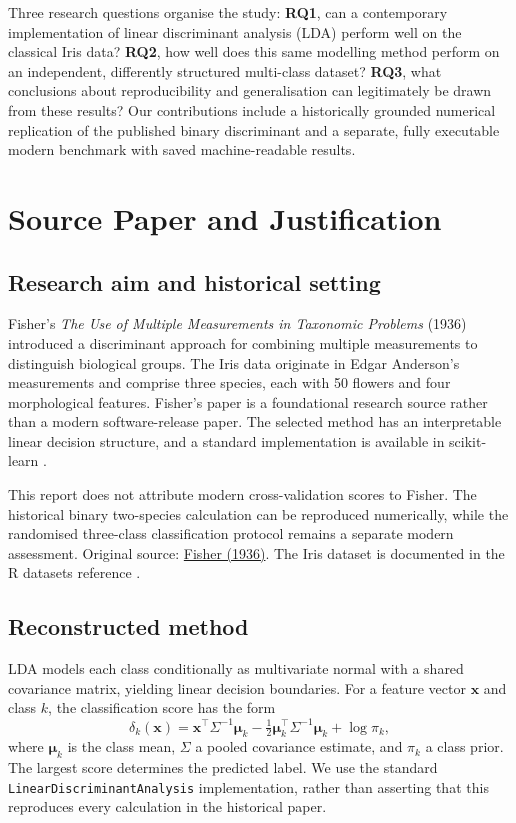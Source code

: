 \documentclass[11pt]{article}
\begin{document}
Three research questions organise the study: \textbf{RQ1}, can a contemporary implementation of linear discriminant analysis (LDA) perform well on the classical Iris data? \textbf{RQ2}, how well does this same modelling method perform on an independent, differently structured multi-class dataset? \textbf{RQ3}, what conclusions about reproducibility and generalisation can legitimately be drawn from these results? Our contributions include a historically grounded numerical replication of the published binary discriminant and a separate, fully executable modern benchmark with saved machine-readable results.

\section{Source Paper and Justification}
\subsection{Research aim and historical setting}
Fisher's \textit{The Use of Multiple Measurements in Taxonomic Problems} (1936) introduced a discriminant approach for combining multiple measurements to distinguish biological groups. The Iris data originate in Edgar Anderson's measurements and comprise three species, each with 50 flowers and four morphological features. Fisher's paper is a foundational research source rather than a modern software-release paper. The selected method has an interpretable linear decision structure, and a standard implementation is available in scikit-learn \citep{pedregosa2011}.

This report does not attribute modern cross-validation scores to Fisher. The historical binary two-species calculation can be reproduced numerically, while the randomised three-class classification protocol remains a separate modern assessment. Original source: \href{https://doi.org/10.1111/j.1469-1809.1936.tb02137.x}{Fisher (1936)}. The Iris dataset is documented in the R datasets reference \citep{rdatasets}.

\subsection{Reconstructed method}
LDA models each class conditionally as multivariate normal with a shared covariance matrix, yielding linear decision boundaries. For a feature vector $\mathbf{x}$ and class $k$, the classification score has the form
\begin{equation}
\delta_k(\mathbf{x})=\mathbf{x}^{\top}\Sigma^{-1}\boldsymbol\mu_k-\tfrac12\boldsymbol\mu_k^{\top}\Sigma^{-1}\boldsymbol\mu_k+\log \pi_k,
\end{equation}
where $\boldsymbol\mu_k$ is the class mean, $\Sigma$ a pooled covariance estimate, and $\pi_k$ a class prior. The largest score determines the predicted label. We use the standard \texttt{LinearDiscriminantAnalysis} implementation, rather than asserting that this reproduces every calculation in the historical paper.
\end{document}
